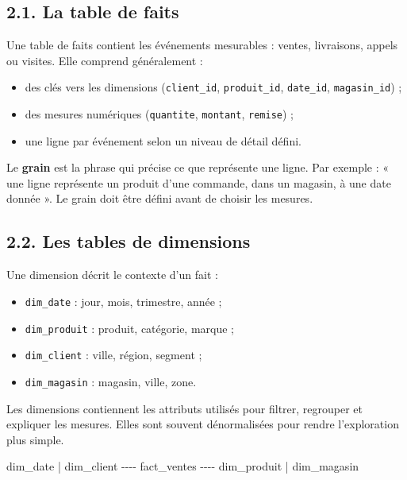 \documentclass[
  french,
  letterpaper,
  open=any]{scrbook}
\newenvironment{Shaded}{\begin{snugshade}}{\end{snugshade}}
\newcommand{\NormalTok}[1]{\textcolor[rgb]{0.00,0.23,0.31}{#1}}
\providecommand{\tightlist}{%
  \setlength{\itemsep}{0pt}\setlength{\parskip}{0pt}}
\theoremstyle{definition}
\theoremstyle{definition}
\theoremstyle{remark}
\begin{document}
\subsection{2.1. La table de faits}\label{la-table-de-faits}

Une table de faits contient les événements mesurables : ventes,
livraisons, appels ou visites. Elle comprend généralement :

\begin{itemize}
\tightlist
\item
  des clés vers les dimensions (\texttt{client\_id},
  \texttt{produit\_id}, \texttt{date\_id}, \texttt{magasin\_id}) ;
\item
  des mesures numériques (\texttt{quantite}, \texttt{montant},
  \texttt{remise}) ;
\item
  une ligne par événement selon un niveau de détail défini.
\end{itemize}

Le \textbf{grain} est la phrase qui précise ce que représente une ligne.
Par exemple : « une ligne représente un produit d'une commande, dans un
magasin, à une date donnée ». Le grain doit être défini avant de choisir
les mesures.

\subsection{2.2. Les tables de
dimensions}\label{les-tables-de-dimensions}

Une dimension décrit le contexte d'un fait :

\begin{itemize}
\tightlist
\item
  \texttt{dim\_date} : jour, mois, trimestre, année ;
\item
  \texttt{dim\_produit} : produit, catégorie, marque ;
\item
  \texttt{dim\_client} : ville, région, segment ;
\item
  \texttt{dim\_magasin} : magasin, ville, zone.
\end{itemize}

Les dimensions contiennent les attributs utilisés pour filtrer,
regrouper et expliquer les mesures. Elles sont souvent dénormalisées
pour rendre l'exploration plus simple.

\begin{Shaded}
\begin{Highlighting}[]
\NormalTok{                         dim\_date}
\NormalTok{                            |}
\NormalTok{dim\_client {-}{-}{-}{-} fact\_ventes {-}{-}{-}{-} dim\_produit}
\NormalTok{                            |}
\NormalTok{                       dim\_magasin}
\end{Highlighting}
\end{Shaded}
\end{document}
